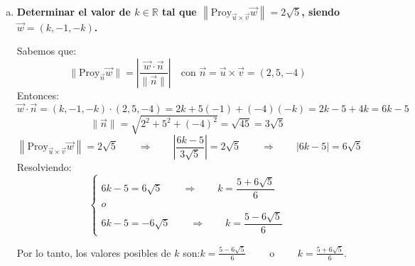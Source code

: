 \documentclass[11pt,a4paper]{article}
\begin{document}
\begin{enumerate}[\hspace{-5mm} 1) ]
\begin{enumerate}[a)]
\begin{multicols}{2}
    \vspace{1cm}

    \begin{center}
    Figura 2: $\vec{v} \times \vec{u}$\\[3mm]
    \end{center}
\end{multicols}





    \item \textbf{Determinar el valor de $ k \in \mathbb{R} $ tal que $ \left\| \text{Proy}_{\vec{u} \times \vec{v}} \vec{w} \right\| = 2\sqrt{5} $, siendo $ \vec{w} = (k, -1, -k) $.}

    Sabemos que:
    \[
    \| \text{Proy}_{\vec{n}} \vec{w} \| = \left| \frac{\vec{w} \cdot \vec{n}}{\|\vec{n}\|} \right|
    \quad \text{con } \vec{n} = \vec{u} \times \vec{v} = (2,5,-4)
    \]
    Entonces:
    \[
    \vec{w} \cdot \vec{n} = (k, -1, -k) \cdot (2,5,-4) = 2k + 5(-1) + (-4)(-k) = 2k - 5 + 4k = 6k - 5
    \]
    \[
    \| \vec{n} \| = \sqrt{2^2 + 5^2 + (-4)^2} = \sqrt{45} = 3\sqrt{5}
    \]
    \[
    \left\| \text{Proy}_{\vec{u} \times \vec{v}} \vec{w} \right\| = 2\sqrt{5} \qquad\Rightarrow\qquad \left| \frac{6k - 5}{3\sqrt{5}} \right| = 2\sqrt{5}
    \qquad\Rightarrow\qquad |6k - 5| = 6\sqrt{5}  
    \]
    Resolviendo:
    \[
    \begin{cases}
    6k - 5 = 6\sqrt{5} \qquad\Rightarrow\qquad  k = \dfrac{5 + 6\sqrt{5}}{6} \\[1mm]
    o
    \\
    6k - 5 = -6\sqrt{5} \qquad\Rightarrow\qquad  k = \dfrac{5 - 6\sqrt{5}}{6}
    \end{cases}
    \]

    Por lo tanto, los valores posibles de $ k $ son:\quad $k = \frac{5 - 6\sqrt{5}}{6} \qquad\text{ o }\qquad  k = \frac{5 + 6\sqrt{5}}{6}$.


\end{enumerate}
\end{enumerate}
\end{document}
